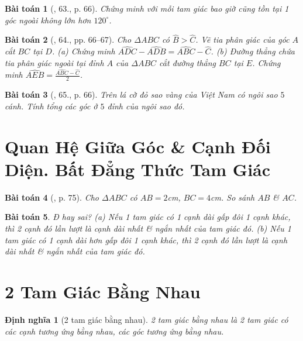 \documentclass{article}
\newtheorem{baitoan}{Bài toán}
\newtheorem{dinhnghia}{Định nghĩa}
\begin{document}
\begin{baitoan}[\cite{Tuyen_Toan_7}, 63., p. 66]
	Chứng minh với mỗi tam giác bao giờ cũng tồn tại 1 góc ngoài không lớn hơn $120^\circ$.
\end{baitoan}

\begin{baitoan}[\cite{Tuyen_Toan_7}, 64., pp. 66--67]
	Cho $\Delta ABC$ có $\widehat{B} > \widehat{C}$. Vẽ tia phân giác của góc $A$ cắt $BC$ tại $D$. (a) Chứng minh $\widehat{ADC} - \widehat{ADB} = \widehat{ABC} - \widehat{C}$. (b) Đường thẳng chứa tia phân giác ngoài tại đỉnh $A$ của $\Delta ABC$ cắt đường thẳng $BC$ tại $E$. Chứng minh $\widehat{AEB} = \frac{\widehat{ABC} - \widehat{C}}{2}$.
\end{baitoan}

\begin{baitoan}[\cite{Tuyen_Toan_7}, 65., p. 66]
	Trên lá cờ đỏ sao vàng của Việt Nam có ngôi sao $5$ cánh. Tính tổng các góc ở $5$ đỉnh của ngôi sao đó.
\end{baitoan}


\section{Quan Hệ Giữa Góc \& Cạnh Đối Diện. Bất Đẳng Thức Tam Giác}

\begin{baitoan}[\cite{SGK_Toan_7_Canh_Dieu_tap_2}, p. 75]
	Cho $\Delta ABC$ có $AB = 2$\emph{cm}, $BC = 4$\emph{cm}. So sánh $AB$ \& $AC$.
\end{baitoan}

\begin{baitoan}
	Đ hay sai? (a) Nếu 1 tam giác có 1 cạnh dài gấp đôi 1 cạnh khác, thì 2 cạnh đó lần lượt là cạnh dài nhất \& ngắn nhất của tam giác đó. (b) Nếu 1 tam giác có 1 cạnh dài hơn gấp đôi 1 cạnh khác, thì 2 cạnh đó lần lượt là cạnh dài nhất \& ngắn nhất của tam giác đó.
\end{baitoan}


\section{2 Tam Giác Bằng Nhau}

\begin{dinhnghia}[2 tam giác bằng nhau]
	\emph{2 tam giác bằng nhau} là 2 tam giác có các cạnh tương ứng bằng nhau, các góc tương ứng bằng nhau.
\end{dinhnghia}
\end{document}

